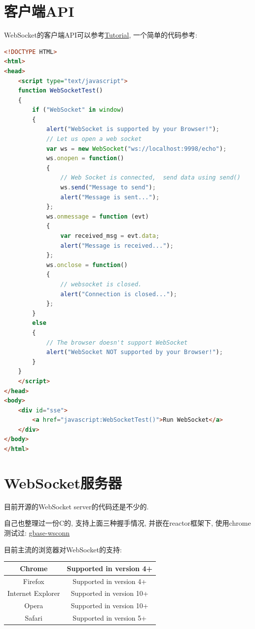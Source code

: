 \section {\ZHH 客户端API} {
    {WebSocket的客户端API可以参考\href{http://www.tutorialspoint.com/html5/html5_websocket.htm}{Tutorial},  一个简单的代码参考: }\par
\begin{lstlisting}[language=html]
<!DOCTYPE HTML>
<html>
<head>
    <script type="text/javascript">
    function WebSocketTest()
    {
        if ("WebSocket" in window)
        {
            alert("WebSocket is supported by your Browser!");
            // Let us open a web socket
            var ws = new WebSocket("ws://localhost:9998/echo");
            ws.onopen = function()
            {
                // Web Socket is connected,  send data using send()
                ws.send("Message to send");
                alert("Message is sent...");
            };
            ws.onmessage = function (evt)
            {
                var received_msg = evt.data;
                alert("Message is received...");
            };
            ws.onclose = function()
            {
                // websocket is closed.
                alert("Connection is closed...");
            };
        }
        else
        {
            // The browser doesn't support WebSocket
            alert("WebSocket NOT supported by your Browser!");
        }
    }
    </script>
</head>
<body>
    <div id="sse">
        <a href="javascript:WebSocketTest()">Run WebSocket</a>
    </div>
</body>
</html>
\end{lstlisting}
}

\section {\ZHH WebSocket服务器} {
    {目前开源的WebSocket server的代码还是不少的.}\par
    {自己也整理过一份C的, 支持上面三种握手情况, 并嵌在reactor框架下, 使用chrome测试过: \href{https://github.com/gaccob/gbase/blob/master/net/wsconn.h}{gbase-wsconn}}\par
    {目前主流的浏览器对WebSocket的支持: }\par
\begin {table} [htbp]
    \centering
    \begin {tabular} {| c | c |}
        \hline
        Chrome  &   Supported in version 4+ \\
        \hline
        Firefox &   Supported in version 4+ \\
        \hline
        Internet Explorer &  Supported in version 10+ \\
        \hline
        Opera &  Supported in version 10+ \\
        \hline
        Safari &  Supported in version 5+ \\
        \hline
    \end{tabular}
\end {table}
}

